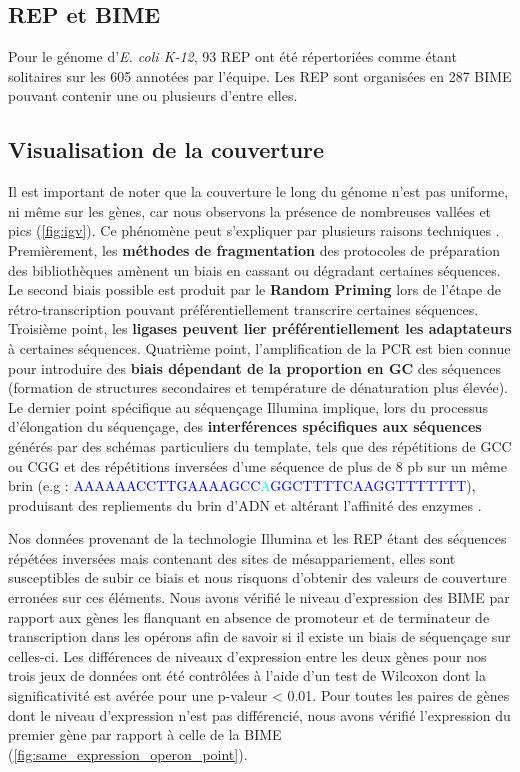 \documentclass[12pt,a4paper]{report}
\begin{document}
\begin{onehalfspace}
\subsection*{REP et BIME}
Pour le génome d'\textit{E. coli K-12}, 93 REP ont été répertoriées comme étant solitaires sur les 605 annotées par l'équipe. Les REP sont organisées en 287 BIME pouvant contenir une ou plusieurs d'entre elles. 

\subsection*{Visualisation de la couverture}
\label{uniformite_couverture}
Il est important de noter que la couverture le long du génome n'est pas uniforme, ni même sur les gènes, car nous observons la présence de nombreuses vallées et pics (\autoref{fig:igv}). Ce phénomène peut s'expliquer par plusieurs raisons techniques \citep{Li2013}. Premièrement, les \textbf{méthodes de fragmentation} des protocoles de préparation des bibliothèques amènent un biais en cassant ou dégradant certaines séquences. Le second biais possible est produit par le \textbf{Random Priming} lors de l'étape de rétro-transcription pouvant préférentiellement transcrire certaines séquences. Troisième point, les \textbf{ligases peuvent lier préférentiellement les adaptateurs} à certaines séquences. Quatrième point, l'amplification de la PCR est bien connue pour introduire des \textbf{biais dépendant de la proportion en GC} des séquences (formation de structures secondaires et température de dénaturation plus élevée). Le dernier point spécifique au séquençage Illumina implique, lors du processus d'élongation du séquençage, des \textbf{interférences spécifiques aux séquences} générés par des schémas particuliers du template, tels que des répétitions de GCC ou CGG et des répétitions inversées d'une séquence de plus de 8 pb sur un même brin (e.g : \textcolor{blue}{AAAAAACCTTGAAAAGCC}\textcolor{cyan}{A}\textcolor{blue}{GGCTTTTCAAGGTTTTTTT}), produisant des repliements du brin d'ADN et altérant l'affinité des enzymes \citep{Nakamura2011}. 

Nos données provenant de la technologie Illumina et les REP étant des séquences répétées inversées mais contenant des sites de mésappariement, elles sont susceptibles de subir ce biais et nous risquons d'obtenir des valeurs de couverture erronées sur ces éléments. Nous avons vérifié le niveau d'expression des BIME par rapport aux gènes les flanquant en absence de promoteur et de terminateur de transcription dans les opérons afin de savoir si il existe un biais de séquençage sur celles-ci. Les  différences de niveaux d'expression entre les deux gènes pour nos trois jeux de données ont été contrôlées à l'aide d'un test de Wilcoxon dont la significativité est avérée pour une p-valeur < 0.01. Pour toutes les paires de gènes dont le niveau d'expression n'est pas différencié, nous avons vérifié l'expression du premier gène par rapport à celle de la BIME (\autoref{fig:same_expression_operon_point}).


\end{onehalfspace}
\end{document}
